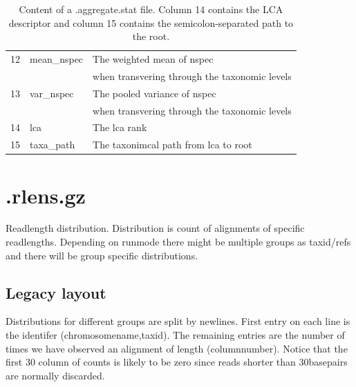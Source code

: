 \documentclass[10pt]{article}
\begin{document}
\begin{table}[h]
\begin{tabular}{rll}
  12 & {mean\_nspec} & The weighted mean of nspec \\ & & when transvering through the taxonomic levels\\
  13 & {var\_nspec} & The pooled variance of nspec \\ & & when transvering through the taxonomic levels\\
  14 & {lca} & The lca rank \\
  15 & {taxa\_path} & The taxonimcal path from lca to root \\ \hline
\end{tabular}\label{aggregate}
\caption{Content of a .aggregate.stat file. Column 14 contains the LCA
  descriptor and column 15 contains the semicolon-separated path to the root.}
\end{table}

\section{.rlens.gz}
Readlength distribution. Distribution is count of alignments of
specific readlengths. Depending on runmode there might be multiple
groups as taxid/refs and there will be group specific
distributions.
\subsection{Legacy layout}
Distributions for different groups are split by
newlines. First entry on each line is the identifer
(chromosomename,taxid). The remaining entries are the number of times
we have observed an alignment of length (columnnumber). Notice that
the first 30 column of counts is likely to be zero since reads shorter
than 30basepairs are normally discarded.
\end{document}
